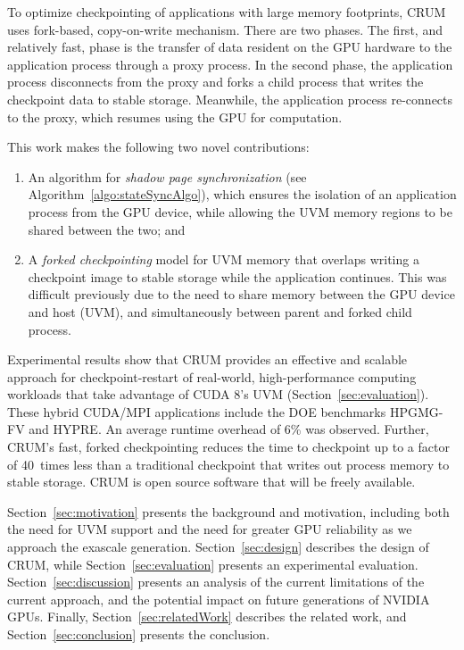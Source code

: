 \documentclass[11pt]{article}
\begin{document}
To optimize checkpointing of applications with large memory footprints, CRUM
uses fork-based, copy-on-write mechanism.
There are two phases. The first,
and relatively fast, phase is the transfer of data resident on the GPU
hardware to the application process through a proxy process.
In the second phase, the application process disconnects from
the proxy and forks a child process that writes the checkpoint data to stable storage.
Meanwhile, the application process re-connects to the proxy, which resumes
using the GPU for computation.


This work makes the following two novel contributions:

\begin{enumerate}
  \item An algorithm for {\em shadow page synchronization}
	(see Algorithm~\ref{algo:stateSyncAlgo}), which ensures
	the isolation of an application process
	from the GPU device, while allowing the UVM memory
	regions to be shared between the two; and
\item A {\em forked checkpointing} model for UVM memory that
	overlaps writing a checkpoint image to stable storage
	while the application continues.
	This was difficult previously
	due to the need to share memory between the GPU device and host (UVM),
	and simultaneously between parent and forked child process.
\end{enumerate}



Experimental results show that CRUM provides an effective and scalable
approach for checkpoint-restart of real-world, high-performance computing
workloads that take advantage of CUDA 8's UVM (Section~\ref{sec:evaluation}).
These hybrid CUDA/MPI applications include the DOE benchmarks HPGMG-FV and
HYPRE.  An average runtime overhead of 6\% was observed.  Further, CRUM's
fast, forked checkpointing reduces the time to checkpoint up to a factor of
40~times less than a traditional checkpoint that writes out process memory
to stable storage. CRUM is open source software that will be freely available.






Section~\ref{sec:motivation} presents the background and
motivation, including both the need for UVM support and the
need for greater GPU reliability as we approach the exascale generation.
Section~\ref{sec:design} describes the design of CRUM, while
Section~\ref{sec:evaluation} presents an experimental evaluation.
Section~\ref{sec:discussion} presents an analysis of the current
limitations of the current approach, and the potential impact on
future generations of NVIDIA GPUs.
Finally, Section~\ref{sec:relatedWork} describes the related work,
and Section~\ref{sec:conclusion} presents the conclusion.
\end{document}
